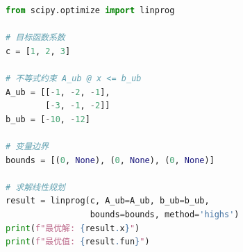 \documentclass{wordreplica}
\begin{document}

\begin{lstlisting}[language=Python]
from scipy.optimize import linprog

# 目标函数系数
c = [1, 2, 3]

# 不等式约束 A_ub @ x <= b_ub
A_ub = [[-1, -2, -1],
        [-3, -1, -2]]
b_ub = [-10, -12]

# 变量边界
bounds = [(0, None), (0, None), (0, None)]

# 求解线性规划
result = linprog(c, A_ub=A_ub, b_ub=b_ub,
                 bounds=bounds, method='highs')
print(f"最优解: {result.x}")
print(f"最优值: {result.fun}")
\end{lstlisting}
\end{document}
